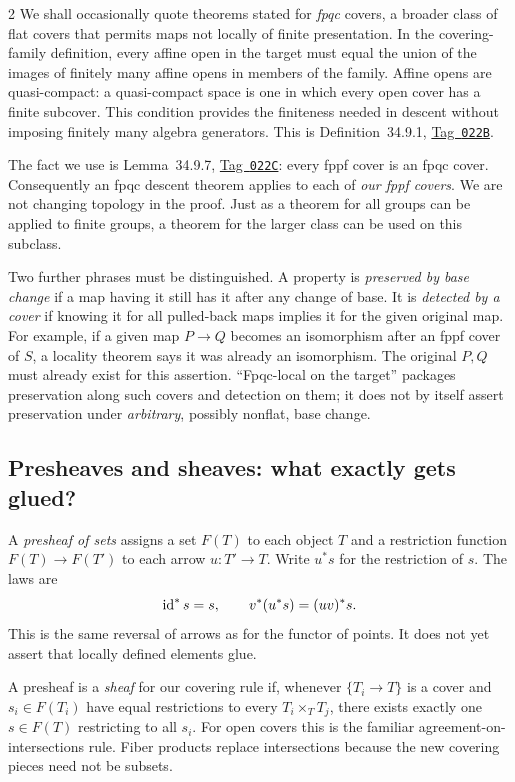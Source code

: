 \documentclass[12pt]{memoir}
\newcommand{\BGtag}[1]{\href{https://stacks.math.columbia.edu/tag/#1}{Tag~\texttt{#1}}}
\begin{document}
\begin{multicols}{2}
We shall occasionally quote theorems stated for \emph{fpqc} covers,
a broader class of flat covers that permits maps not locally of finite
presentation. In the covering-family definition, every affine open
in the target must equal the union of the images of finitely many
affine opens in members of the family. Affine opens are quasi-compact:
a quasi-compact space
is one in which every open cover has a finite subcover. This condition
provides the finiteness needed in descent without imposing finitely
many algebra generators. This is Definition~34.9.1, \BGtag{022B}.

The fact we use is Lemma~34.9.7, \BGtag{022C}: every fppf cover is
an fpqc cover. Consequently an fpqc descent theorem applies to each
of \emph{our fppf covers}. We are not changing topology in the proof.
Just as a theorem for all groups can be applied to finite groups, a
theorem for the larger class can be used on this subclass.

Two further phrases must be distinguished. A property is
\emph{preserved by base change} if a map having it still has it after
any change of base. It is \emph{detected by a cover} if knowing it
for all pulled-back maps implies it for the given original map.
For example, if a given map $P\to Q$ becomes an isomorphism after an
fppf cover of $S$, a locality theorem says it was already an
isomorphism. The original $P,Q$ must already exist for this assertion.
``Fpqc-local on the target'' packages preservation along such covers
and detection on them; it does not by itself assert preservation
under \emph{arbitrary}, possibly nonflat, base change.

\subsection{Presheaves and sheaves: what exactly gets glued?}
A \emph{presheaf of sets} assigns a set $F(T)$ to each object $T$ and
a restriction function $F(T)\to F(T')$ to each arrow $u:T'\to T$.
Write $u^*s$ for the restriction of $s$. The laws are
\[
 \operatorname{id}^*s=s,\qquad v^*(u^*s)=(uv)^*s.
\]
This is the same reversal of arrows as for the functor of points.
It does not yet assert that locally defined elements glue.

A presheaf is a \emph{sheaf} for our covering rule if, whenever
$\{T_i\to T\}$ is a cover and $s_i\in F(T_i)$ have equal
restrictions to every $T_i\times_T T_j$, there exists exactly one
$s\in F(T)$ restricting to all $s_i$. For open covers this is the
familiar agreement-on-intersections rule. Fiber products replace
intersections because the new covering pieces need not be subsets.


\end{multicols}
\end{document}
